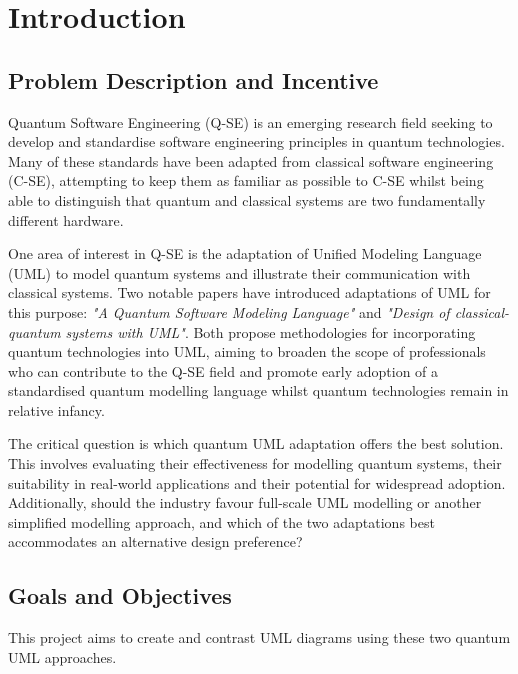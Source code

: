 \documentclass{article}
\begin{document}
\tableofcontents

\newpage

\section{Introduction}

\subsection{Problem Description and Incentive}

Quantum Software Engineering (Q-SE) is an emerging research field seeking to develop and standardise software engineering principles in quantum technologies. Many of these standards have been adapted from classical software engineering (C-SE), attempting to keep them as familiar as possible to C-SE whilst being able to distinguish that quantum and classical systems are two fundamentally different hardware. 

One area of interest in Q-SE is the adaptation of Unified Modeling Language (UML) to model quantum systems and illustrate their communication with classical systems. Two notable papers have introduced adaptations of UML for this purpose: \textit{"A Quantum Software Modeling Language"}\cite{Pérez-Delgado2022} and \textit{"Design of classical-quantum systems with UML"}\cite{Pérez-Castillo2022}. Both propose methodologies for incorporating quantum technologies into UML, aiming to broaden the scope of professionals who can contribute to the Q-SE field and promote early adoption of a standardised quantum modelling language whilst quantum technologies remain in relative infancy. 

The critical question is which quantum UML adaptation offers the best solution. This involves evaluating their effectiveness for modelling quantum systems, their suitability in real-world applications and their potential for widespread adoption. Additionally, should the industry favour full-scale UML modelling or another simplified modelling approach, and which of the two adaptations best accommodates an alternative design preference?

\subsection{Goals and Objectives}

This project aims to create and contrast UML diagrams using these two quantum UML approaches.
\end{document}
